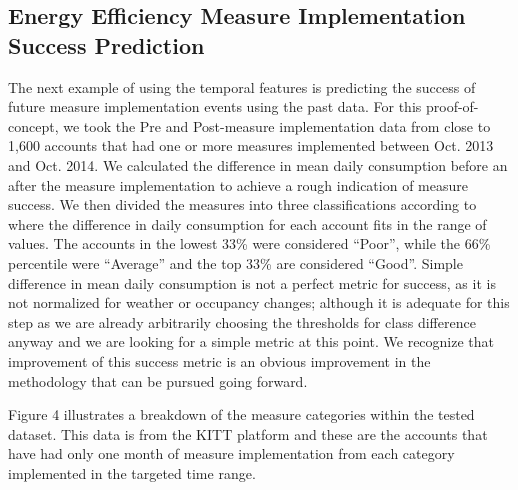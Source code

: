 \subsection{Energy Efficiency Measure Implementation Success Prediction}
\label{sec:measuresuccess}

The next example of using the temporal features is predicting the success of future measure implementation events using the past data. For this proof-of-concept, we took the Pre and Post-measure implementation data from close to 1,600 accounts that had one or more measures implemented between Oct. 2013 and Oct. 2014. We calculated the difference in mean daily consumption before an after the measure implementation to achieve a rough indication of measure success. We then divided the measures into three classifications according to where the difference in daily consumption for each account fits in the range of values. The accounts in the lowest 33\% were considered “Poor”, while the 66\% percentile were “Average” and the top 33\% are considered “Good”. Simple difference in mean daily consumption is not a perfect metric for success, as it is not normalized for weather or occupancy changes; although it is adequate for this step as we are already arbitrarily choosing the thresholds for class difference anyway and we are looking for a simple metric at this point. We recognize that improvement of this success metric is an obvious improvement in the methodology that can be pursued going forward.

Figure 4 illustrates a breakdown of the measure categories within the tested dataset. This data is from the KITT platform and these are the accounts that have had only one month of measure implementation from each category implemented in the targeted time range.